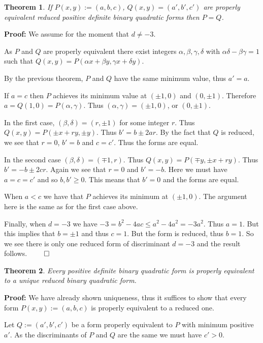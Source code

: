 \documentclass[a4paper,10pt]{amsart}
\newtheorem{theorem}{Theorem}[section]
\begin{document}
\begin{theorem}
If $P(x, y) := (a, b, c)$, $Q(x, y) = (a', b', c')$ are properly equivalent reduced positive definite binary quadratic forms then $P = Q$.
\end{theorem}

\textbf{Proof:}
We assume for the moment that $d \neq -3$. 

As $P$ and $Q$ are properly equivalent there exist integers $\alpha, \beta, \gamma, \delta$ with $\alpha\delta - \beta\gamma = 1$ such that $Q(x, y) = P(\alpha x + \beta y, \gamma x + \delta y)$. 

By the previous theorem, $P$ and $Q$ have the same minimum value, thus $a' = a$. 

If $a = c$ then $P$ achieves its minimum value at $(\pm 1, 0)$ and $(0, \pm 1)$. Therefore $a = Q(1, 0) = P(\alpha, \gamma)$. Thus $(\alpha, \gamma) = (\pm 1, 0)$, or $(0, \pm 1)$.

In the first case, $(\beta, \delta) = (r, \pm 1)$ for some integer $r$. Thus $Q(x, y) = P(\pm x + ry, \pm y)$. Thus $b' = b \pm 2ar$. By the fact that $Q$ is reduced, we see that $r = 0$, $b' = b$ and $c = c'$. Thus the forms are equal.

In the second case $(\beta, \delta) = (\mp 1, r)$. Thus $Q(x, y) = P(\mp y, \pm x + ry)$. Thus $b' = -b \pm 2cr$. Again we see that $r = 0$ and $b' = -b$. Here we must have $a = c = c'$ and so $b, b' \geq 0$. This means that $b' = 0$ and the forms are equal.

When $a < c$ we have that $P$ achieves its minimum at $(\pm 1, 0)$. The argument here is the same as for the first case above.

Finally, when $d = -3$ we have $-3 = b^2 - 4ac \leq a^2 - 4a^2 = -3a^2$. Thus $a = 1$. But this implies that $b = \pm 1$ and thus $c = 1$. But the form is reduced, thus $b = 1$. So we see there is only one reduced form of discriminant $d = -3$ and the result follows. $\qed$

\begin{theorem}
Every positive definite binary quadratic form is properly equivalent to a unique reduced binary quadratic form.
\end{theorem}

\textbf{Proof:} We have already shown uniqueness, thus it suffices to show that every form $P(x, y) := (a, b, c)$ is properly equivalent to a reduced one.

Let $Q := (a', b', c')$ be a form properly equivalent to $P$ with minimum positive $a'$. As the discriminants of $P$ and $Q$ are the same we must have $c' > 0$. 
\end{document}
